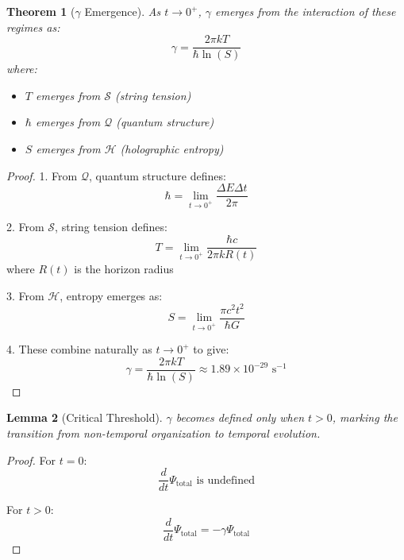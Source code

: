 \documentclass{article}
\newtheorem{theorem}{Theorem}
\newtheorem{lemma}[theorem]{Lemma}
\begin{document}
\begin{theorem}[$\gamma$ Emergence]
As $t \to 0^{+}$, $\gamma$ emerges from the interaction of these regimes as:
\begin{equation}
\gamma = \frac{2\pi kT}{\hbar \ln(S)}
\end{equation}
where:
\begin{itemize}
    \item $T$ emerges from $\mathcal{S}$ (string tension)
    \item $\hbar$ emerges from $\mathcal{Q}$ (quantum structure)
    \item $S$ emerges from $\mathcal{H}$ (holographic entropy)
\end{itemize}
\end{theorem}

\begin{proof}
1. From $\mathcal{Q}$, quantum structure defines:
   \begin{equation}
   \hbar = \lim_{t \to 0^{+}} \frac{\Delta E \Delta t}{2\pi}
   \end{equation}

2. From $\mathcal{S}$, string tension defines:
   \begin{equation}
   T = \lim_{t \to 0^{+}} \frac{\hbar c}{2\pi kR(t)}
   \end{equation}
   where $R(t)$ is the horizon radius

3. From $\mathcal{H}$, entropy emerges as:
   \begin{equation}
   S = \lim_{t \to 0^{+}} \frac{\pi c^2t^2}{\hbar G}
   \end{equation}

4. These combine naturally as $t \to 0^{+}$ to give:
   \begin{equation}
   \gamma = \frac{2\pi kT}{\hbar \ln(S)} \approx 1.89 \times 10^{-29} \text{ s}^{-1}
   \end{equation}
\end{proof}

\begin{lemma}[Critical Threshold]
$\gamma$ becomes defined only when $t > 0$, marking the transition from non-temporal organization to temporal evolution.
\end{lemma}

\begin{proof}
For $t = 0$:
\begin{equation}
\frac{d}{dt}\Psi_{\text{total}} \text{ is undefined}
\end{equation}

For $t > 0$:
\begin{equation}
\frac{d}{dt}\Psi_{\text{total}} = -\gamma\Psi_{\text{total}}
\end{equation}
\end{proof}
\end{document}
